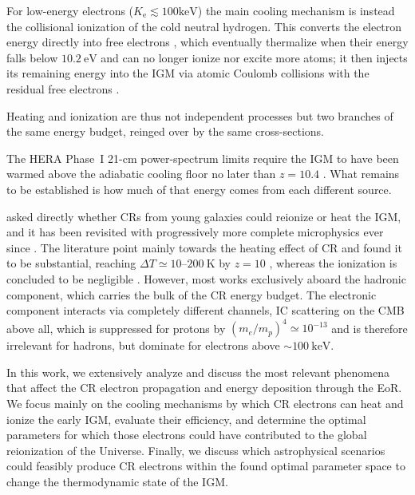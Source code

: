 \documentclass{aa}
\begin{document}
For low-energy electrons ($K_{\mathrm{e}} \lesssim 100 \text{keV}$) the main cooling mechanism is instead the collisional ionization of the cold neutral hydrogen. This converts the electron energy directly into free electrons \citep{KimRudd1994,Kim2000}, which eventually
thermalize when their energy falls below $10.2\ \mathrm{eV}$ and can no longer ionize nor excite more atoms; it then injects its remaining energy into the IGM via atomic Coulomb collisions with the residual free electrons \citep{Shull1985,Furlanetto2010}.

Heating and ionization are thus not independent processes but two branches of the same energy budget, reinged over by the same cross-sections. 

The HERA Phase~I 21-cm power-spectrum limits require the IGM to have been warmed above the adiabatic cooling floor no later than $z = 10.4$ \citep{HERA2023,Mertens2025}. What remains to be established is how much of that energy comes from each different source.

\citet{Nath1993} asked directly whether CRs from young
galaxies could reionize or heat the IGM, and it has been revisited with progressively more complete microphysics ever since \citep{Samui2005,Sazonov2015,Leite2017,Jana2018,Bera2023,GesseyJones2023}. The literature point mainly towards the heating effect of CR and found it to be substantial, reaching $\Delta T \simeq 10$--$200\ \mathrm{K}$ by $z = 10$ \citep{Sazonov2015,Leite2017}, whereas the ionization is concluded to be negligible \citep{Leite2017}. However, most works exclusively aboard the hadronic component, which carries the bulk of the CR energy budget. The electronic component interacts via completely different channels, IC scattering on the CMB above all, which is suppressed for protons by $(m_e/m_p)^{4} \simeq 10^{-13}$ and is therefore irrelevant for hadrons, but dominate for electrons above $\sim\!100\ \mathrm{keV}$.


In this work, we extensively analyze and discuss the most relevant phenomena that affect the CR electron propagation and energy deposition through the EoR. We focus mainly on the cooling mechanisms by which CR electrons can heat and ionize the early IGM, evaluate their efficiency, and determine the optimal parameters for which those electrons could have contributed to the global reionization of the Universe. Finally, we discuss
which astrophysical scenarios could feasibly produce CR electrons within the found optimal parameter space to change the thermodynamic state of the IGM.
\end{document}
